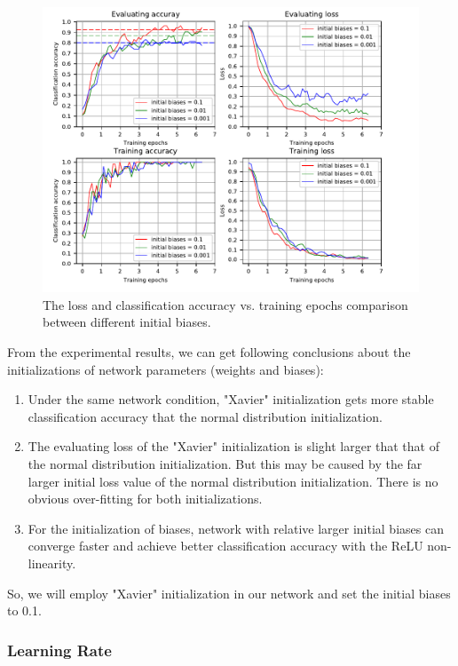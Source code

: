  \begin{figure}
	\includegraphics[trim=0cm 0cm 0cm 0cm]{fig01/plot_biases.pdf}
	\caption{The loss and classification accuracy vs. training epochs comparison between different initial biases.}
	\label{fig:plot_biases}
\end{figure}

From the experimental results, we can get following conclusions about the initializations of network parameters (weights and biases): 
\begin{enumerate}
	\item Under the same network condition, "Xavier" initialization gets more stable classification accuracy that the normal distribution initialization. 
	\item The evaluating loss of the "Xavier" initialization is slight larger that that of the normal distribution initialization. But this may be caused by the far larger initial loss value of the normal distribution initialization. There is no obvious over-fitting for both initializations.
	\item For the initialization of biases, network with relative larger initial biases can converge faster and achieve better classification accuracy with the ReLU non-linearity.
\end{enumerate} 
So, we will employ "Xavier" initialization in our network and set the initial biases to 0.1. 
\subsubsection{Learning Rate}
